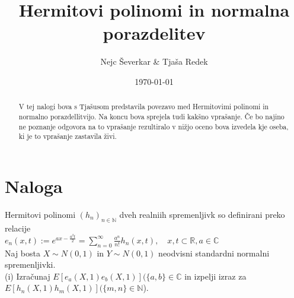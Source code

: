 \documentclass[letterpaper, titlepage, fleqn]{article}
\begin{document}
\title{Hermitovi polinomi in normalna porazdelitev}
\author{Nejc Ševerkar \& Tjaša Redek}
\date{\today}
\maketitle

\begin{abstract}
V tej nalogi bova s Tjašusom predstavila
povezavo med Hermitovimi polinomi in normalno porazdellitvijo.
Na koncu bova sprejela tudi kakšno vprašanje.
Če bo najino ne poznanje odgovora na to vprašanje
rezultiralo v nižjo oceno bova izvedela kje oseba, ki
je to vprašanje zastavila živi.
\end{abstract}

\section*{Naloga}
Hermitovi polinomi $(h_n)_{n \in \mathbb{N}}$ dveh realniih spremenljivk
so definirani preko relacije \\[10px]
$e_n(x, t) := e^{ax -\frac{a^2t}{2}} = \sum_{n=0}^{\infty} \frac{a^n}{n!} h_n(x, t), 
\quad {x, t} \subset \mathbb{R}, a \in \mathbb{C}$ \\[10px]
Naj bosta $X \sim N(0, 1)$ in $Y \sim N(0, 1)$ neodvisni standardni normalni spremenljivki. \\[10px]
(i) Izračunaj $E[e_a(X,1) e_b(X,1)] (\{a,b\} \in \mathbb{C} $ in izpelji izraz za $ E[h_n(X,1) h_m(X,1)] (\{m,n\}\in \mathbb{N} $).\\[15px]
\end{document}
